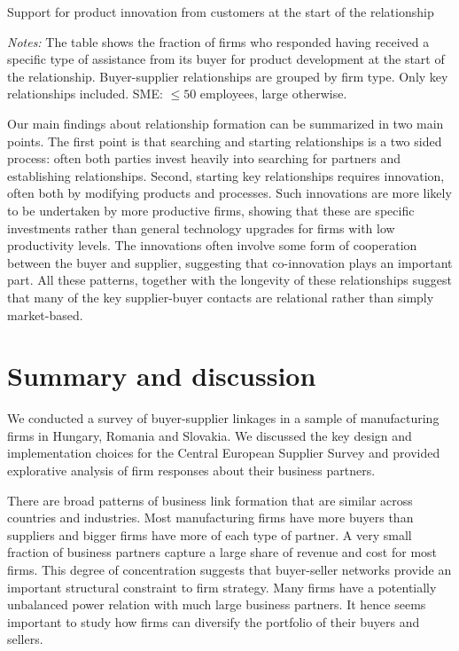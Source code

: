 \usepackage{}\documentclass[final, dvipsnames, authoryear,12pt]{elsarticle}
\begin{document}
\begin{table}[h]
    \caption{Support for product innovation from customers at the start of the relationship}
    \label{tab:start_support}
    

    {\scriptsize \textit{Notes:} The table shows the fraction of firms who responded having received a specific type of assistance from its buyer for product development at the start of the relationship. Buyer-supplier relationships are grouped by firm type. Only key relationships included. SME: $\le 50$ employees, large otherwise.}
\end{table}

Our main findings about relationship formation can be summarized in two main points. The first point is that searching and starting relationships is a two sided process: often both parties invest heavily into searching for partners and establishing relationships. Second, starting key relationships requires innovation, often both by modifying products and processes. Such innovations are more likely to be undertaken by more productive firms, showing that these are specific investments rather than general technology upgrades for firms with low productivity levels. The innovations often involve some form of cooperation between the buyer and supplier, suggesting that co-innovation plays an important part. All these patterns, together with the longevity of these relationships suggest that many of the key supplier-buyer contacts are relational rather than simply market-based. 

\section{Summary and discussion}
\label{sec:conclusions}
We conducted a survey of buyer-supplier linkages in a sample of manufacturing firms in Hungary, Romania and Slovakia. We discussed the key design and implementation choices for the Central European Supplier Survey and provided explorative analysis of firm responses about their business partners.

There are broad patterns of business link formation that are similar across countries and industries. Most manufacturing firms have more buyers than suppliers and bigger firms have more of each type of partner. A very small fraction of business partners capture a large share of revenue and cost for most firms. This degree of concentration suggests that buyer-seller networks provide an important structural constraint to firm strategy. Many firms have a potentially unbalanced power relation with much large business partners. It hence seems important to study how firms can diversify the portfolio of their buyers and sellers.
\end{document}
